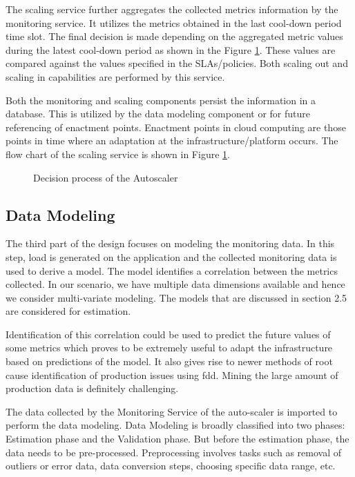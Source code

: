 \documentclass[article,type=msc,colorback,12pt,accentcolor=tud8b,table]{tudthesis}
\begin{document}
 	The scaling service further aggregates the collected metrics information by the monitoring service. It utilizes the metrics obtained in the last cool-down period time slot. The final decision is made depending on the aggregated metric values during the latest cool-down period as shown in the Figure \ref{fig:autoscaler}. These values are compared against the values specified in the SLAs/policies. Both scaling out and scaling in capabilities are performed by this service.
 	 	    
	 Both the monitoring and scaling components persist the information in a database. This is utilized by the data modeling component or for future referencing of enactment points. Enactment points in cloud computing are those points in time where an adaptation at the infrastructure/platform occurs. The flow chart of the scaling service is shown in Figure \ref{fig:autoscaler}.
	 
	  	 	 \begin{figure}[!h]
	  	 	 	\begin{center}
	  	 	 		\makebox[\textwidth]{\texttt{[image: C3]}}
	  	 	 	\end{center}
	  	 	 	\caption{Decision process of the Autoscaler}
	  	 	 	\label{fig:autoscaler}
	  	 	 \end{figure}

 	\subsection{Data Modeling}
 	
 	The third part of the design focuses on modeling the monitoring data. In this step, load is generated on the application and the collected monitoring data is used to derive a model. The model identifies a correlation between the metrics collected. In our scenario, we have multiple data dimensions available and hence we consider multi-variate modeling. The models that are discussed in section 2.5 are considered for estimation. 
 	
	 Identification of this correlation could be used to predict the future values of some metrics which proves to be extremely useful to adapt the infrastructure based on predictions of the model. It also gives rise to newer methods of root cause identification of production issues using \gls{fdd}. Mining the large amount of production data is definitely challenging.
 	
 	The data collected by the Monitoring Service of the auto-scaler is imported to perform the data modeling. Data Modeling is broadly classified into two phases: Estimation phase and the Validation phase. But before the estimation phase, the data needs to be pre-processed. Preprocessing involves tasks such as removal of outliers or error data, data conversion steps, choosing specific data range, etc. 
 	
\end{document}
